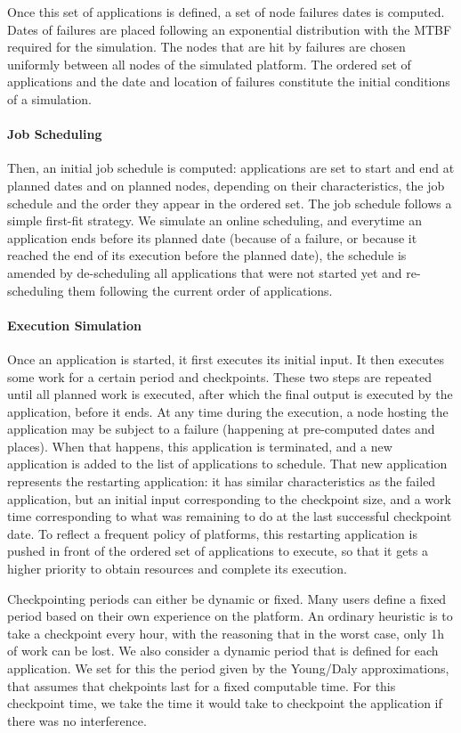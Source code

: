 \documentclass[conference]{IEEEtran}
\begin{document}
Once this set of applications is defined, a set of node failures dates
is computed. Dates of failures are placed following an exponential
distribution with the MTBF required for the simulation. The nodes that
are hit by failures are chosen uniformly between all nodes of the
simulated platform. The ordered set of applications and the date and
location of failures constitute the initial conditions of a simulation.

\paragraph*{Job Scheduling}
Then, an initial job schedule is computed: applications are set to
start and end at planned dates and on planned nodes, depending on
their characteristics, the job schedule and the order they appear in
the ordered set. The job schedule follows a simple first-fit
strategy. We simulate an online scheduling, and everytime an
application ends before its planned date (because of a failure, or
because it reached the end of its execution before the planned date),
the schedule is amended by de-scheduling all applications that were
not started yet and re-scheduling them following the current order of
applications.

\paragraph*{Execution Simulation}
Once an application is started, it first executes its initial
input. It then executes some work for a certain period and
checkpoints. These two steps are repeated until all planned work is
executed, after which the final output is executed by the application,
before it ends. At any time during the execution, a node hosting the
application may be subject to a failure (happening at pre-computed
dates and places). When that happens, this application is terminated,
and a new application is added to the list of applications to
schedule. That new application represents the restarting application:
it has similar characteristics as the failed application, but an
initial input corresponding to the checkpoint size, and a work time
corresponding to what was remaining to do at the last successful
checkpoint date. To reflect a frequent policy of platforms, this
restarting application is pushed in front of the ordered set of
applications to execute, so that it gets a higher priority to obtain
resources and complete its execution.

Checkpointing periods can either be dynamic or fixed. Many users
define a fixed period based on their own experience on the
platform. An ordinary heuristic is to take a checkpoint every hour,
with the reasoning that in the worst case, only 1h of work can be
lost. We also consider a dynamic period that is defined for each
application. We set for this the period given by the Young/Daly
approximations, that assumes that chekpoints last for a fixed
computable time. For this checkpoint time, we take the time it would
take to checkpoint the application if there was no interference.
\end{document}
